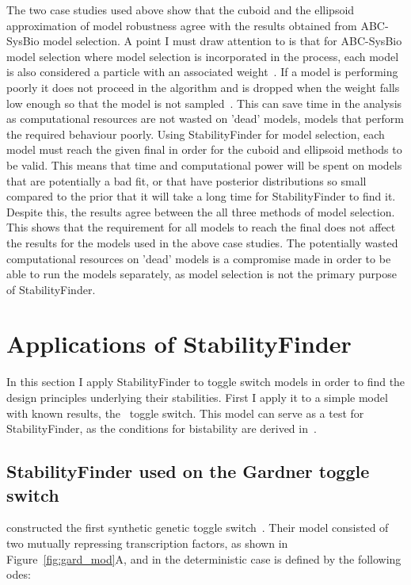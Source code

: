 The two case studies used above show that the cuboid and the ellipsoid approximation of model robustness agree with the results obtained from ABC-SysBio model selection. A point I must draw attention to is that for ABC-SysBio model selection where model selection is incorporated in the process, each model is also considered a particle with an associated weight~\autocite{Toni:2009tr}. If a model is performing poorly it does not proceed in the algorithm and is dropped when the weight falls low enough so that the model is not sampled~\autocite{Toni:2009tr}. This can save time in the analysis as computational resources are not wasted on 'dead' models, models that perform the required behaviour poorly. Using StabilityFinder for model selection, each model must reach the given final \textepsilon{} in order for the cuboid and ellipsoid methods to be valid. This means that time and computational power will be spent on models that are potentially a bad fit, or that have posterior distributions so small compared to the prior that it will take a long time for StabilityFinder to find it. Despite this, the results agree between the all three methods of model selection. This shows that the requirement for all models to reach the final \textepsilon{} does not affect the results for the models used in the above case studies. The potentially wasted computational resources on 'dead' models is a compromise made in order to be able to run the models separately, as model selection is not the primary purpose of StabilityFinder. 

\section{Applications of StabilityFinder}

In this section I apply StabilityFinder to toggle switch models in order to find the design principles underlying their stabilities. First I apply it to a simple model with known results, the~\textcite{Gardner:2000vha} toggle switch. This model can serve as a test for StabilityFinder, as the conditions for bistability are derived in~\textcite{Gardner:2000vha}.


\subsection{StabilityFinder used on the Gardner toggle switch}
\label{sec:gard}
\textcite{Gardner:2000vha} constructed the first synthetic genetic toggle switch~\autocite{Gardner:2000vha}. Their model consisted of two mutually repressing transcription factors, as shown in Figure~\ref{fig:gard_mod}A, and in the deterministic case is defined by the following \acrshort{ode}s:

